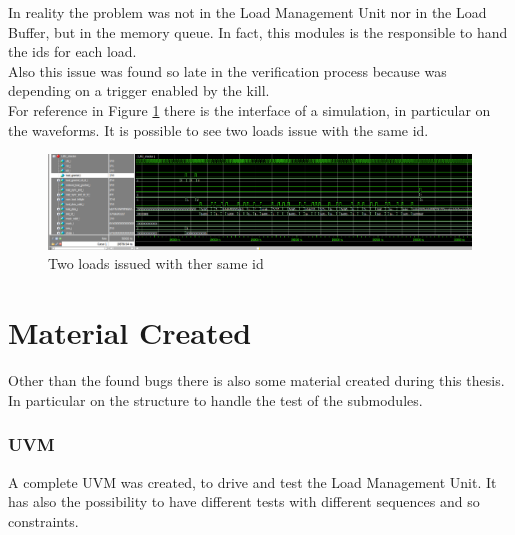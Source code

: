 In reality the problem was not in the Load Management Unit nor in the Load Buffer, but in the memory queue. In fact, this modules is the responsible to hand the ids for each load.\\

Also this issue was found so late in the verification process because was depending on a trigger enabled by the kill.\\

For reference in Figure \ref{2-loads} there is the interface of a simulation, in particular on the waveforms. It is possible to see two loads issue with the same id.\\

\begin{figure}[H]
    \centering
    \includegraphics[scale = 0.25]{Chapter_3/img/2-loads.png}
    \caption{Two loads issued with ther same id}
    \label{2-loads}
\end{figure}


\section{Material Created}
Other than the found bugs there is also some material created during this thesis.\\
In particular on the structure to handle the test of the submodules.\\

\subsubsection{UVM}
A complete UVM was created, to drive and test the Load Management Unit. It has also the possibility to have different tests with different sequences and so constraints.\\

